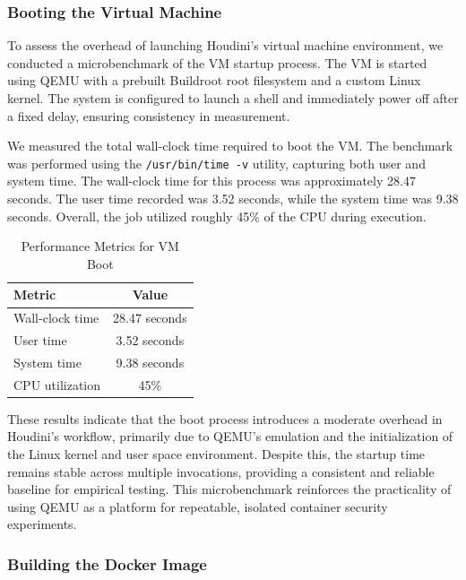 \begin{doublespace}
\subsubsection{Booting the Virtual Machine}

To assess the overhead of launching Houdini’s virtual machine environment, we conducted a microbenchmark of the VM startup process. The VM is started using QEMU with a prebuilt Buildroot root filesystem and a custom Linux kernel. The system is configured to launch a shell and immediately power off after a fixed delay, ensuring consistency in measurement.

We measured the total wall-clock time required to boot the VM. The benchmark was performed using the \texttt{/usr/bin/time -v} utility, capturing both user and system time. The wall-clock time for this process was approximately 28.47 seconds. The user time recorded was 3.52 seconds, while the system time was 9.38 seconds. Overall, the job utilized roughly 45\% of the CPU during execution.

\begin{table}[h]
\centering
\caption{Performance Metrics for VM Boot}
\label{tab:vm-boot-performance}
\begin{tabular}{|l|c|}
\hline
\textbf{Metric}         & \textbf{Value} \\
\hline
Wall-clock time         & 28.47 seconds \\
User time               & 3.52 seconds \\
System time             & 9.38 seconds \\
CPU utilization         & 45\% \\
\hline
\end{tabular}
\end{table}

These results indicate that the boot process introduces a moderate overhead in Houdini’s workflow, primarily due to QEMU’s emulation and the initialization of the Linux kernel and user space environment. Despite this, the startup time remains stable across multiple invocations, providing a consistent and reliable baseline for empirical testing. This microbenchmark reinforces the practicality of using QEMU as a platform for repeatable, isolated container security experiments.


\subsubsection{Building the Docker Image}


\end{doublespace}
